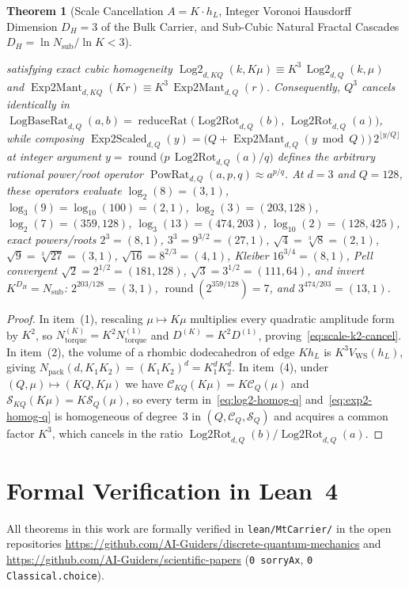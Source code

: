 \documentclass[11pt,a4paper]{article}
\theoremstyle{plain}
\newtheorem{theorem}{Theorem}[section]
\theoremstyle{definition}
\begin{document}
\begin{theorem}[Scale Cancellation $A = K\cdot h_L$, Integer Voronoi Hausdorff Dimension $D_H = 3$ of the Bulk Carrier, and Sub-Cubic Natural Fractal Cascades $D_H = \ln N_{\mathrm{sub}}/\ln K < 3$]
\begin{enumerate}[label=\textbf{(\arabic*)},leftmargin=*]
\begin{equation}
  \end{equation}
  satisfying exact cubic homogeneity $\operatorname{Log2}_{d,KQ}(k,K\mu) \equiv K^3\,\operatorname{Log2}_{d,Q}(k,\mu)$ and $\operatorname{Exp2Mant}_{d,KQ}(K r) \equiv K^3\,\operatorname{Exp2Mant}_{d,Q}(r)$. Consequently, $Q^3$ cancels identically in $\operatorname{LogBaseRat}_{d,Q}(a,b) = \operatorname{reduceRat}\bigl(\operatorname{Log2Rot}_{d,Q}(b),\,\operatorname{Log2Rot}_{d,Q}(a)\bigr)$, while composing $\operatorname{Exp2Scaled}_{d,Q}(y) = \bigl(Q + \operatorname{Exp2Mant}_{d,Q}(y\bmod Q)\bigr)\,2^{\lfloor y/Q\rfloor}$ at integer argument $y = \operatorname{round}\bigl(p\,\operatorname{Log2Rot}_{d,Q}(a)/q\bigr)$ defines the arbitrary rational power/root operator $\operatorname{PowRat}_{d,Q}(a,p,q) \approx a^{p/q}$. At $d=3$ and $Q=128$, these operators evaluate $\log_2(8)=(3,1)$, $\log_3(9)=\log_{10}(100)=(2,1)$, $\log_2(3)=(203,128)$, $\log_2(7)=(359,128)$, $\log_3(13)=(474,203)$, $\log_{10}(2)=(128,425)$, exact powers/roots $2^3=(8,1)$, $3^3=9^{3/2}=(27,1)$, $\sqrt{4}=\sqrt[3]{8}=(2,1)$, $\sqrt{9}=\sqrt[3]{27}=(3,1)$, $\sqrt{16}=8^{2/3}=(4,1)$, Kleiber $16^{3/4}=(8,1)$, Pell convergent $\sqrt{2}=2^{1/2}=(181,128)$, $\sqrt{3}=3^{1/2}=(111,64)$, and invert $K^{D_H} = N_{\mathrm{sub}}$: $2^{203/128}=(3,1)$, $\operatorname{round}(2^{359/128})=7$, and $3^{474/203}=(13,1)$.
\end{enumerate}
\end{theorem}

\begin{proof}
In item~(1), rescaling $\mu \mapsto K\mu$ multiplies every quadratic amplitude form by $K^2$, so $N_{\mathrm{torque}}^{(K)} = K^2 N_{\mathrm{torque}}^{(1)}$ and $D^{(K)} = K^2 D^{(1)}$, proving~\eqref{eq:scale-k2-cancel}. In item~(2), the volume of a rhombic dodecahedron of edge $K h_L$ is $K^3 V_{\mathrm{WS}}(h_L)$, giving $N_{\mathrm{pack}}(d, K_1 K_2) = (K_1 K_2)^d = K_1^d K_2^d$. In item~(4), under $(Q, \mu) \mapsto (KQ, K\mu)$ we have $\mathcal{C}_{KQ}(K\mu) = K\mathcal{C}_Q(\mu)$ and $\mathcal{S}_{KQ}(K\mu) = K\mathcal{S}_Q(\mu)$, so every term in~\eqref{eq:log2-homog-q} and~\eqref{eq:exp2-homog-q} is homogeneous of degree~$3$ in $(Q, \mathcal{C}_Q, \mathcal{S}_Q)$ and acquires a common factor $K^3$, which cancels in the ratio $\operatorname{Log2Rot}_{d,Q}(b)/\operatorname{Log2Rot}_{d,Q}(a)$.
\end{proof}

\section{Formal Verification in Lean~4}
All theorems in this work are formally verified in \texttt{lean/MtCarrier/} in the open repositories \url{https://github.com/AI-Guiders/discrete-quantum-mechanics} and \url{https://github.com/AI-Guiders/scientific-papers} (\texttt{0 sorryAx}, \texttt{0 Classical.choice}).
\end{document}
